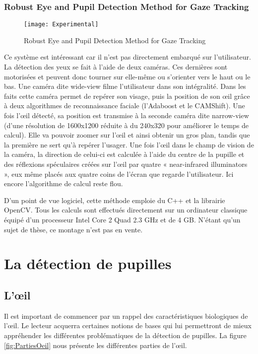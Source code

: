 \subsubsection{Robust Eye and Pupil Detection Method for Gaze Tracking \cite{gwon2013robust}}
\label{SystSC}

\begin{figure}[H]
  \centering
  \texttt{[image: Experimental]}
  \caption{Robust Eye and Pupil Detection Method for Gaze Tracking}
  \label{fig:Experimental}
\end{figure}

Ce système est intéressant car il n’est pas directement embarqué sur l’utilisateur. La détection des yeux se fait à l’aide de deux caméras. Ces dernières sont motorisées et peuvent donc tourner sur elle-même ou s’orienter vers le haut ou le bas. 
Une caméra dite wide-view filme l’utilisateur dans son intégralité. Dans les faits cette caméra permet de repérer son visage, puis la position de son œil grâce à deux algorithmes de reconnaissance faciale (l’Adaboost et le CAMShift). Une fois l’œil détecté, sa position est transmise à la seconde caméra dite narrow-view (d’une résolution de 1600x1200 réduite à du 240x320 pour améliorer le temps de calcul). Elle va pouvoir zoomer sur l’œil et ainsi obtenir un gros plan, tandis que la première ne sert qu’à repérer l’usager. Une fois l’œil dans le champ de vision de la caméra, la direction de celui-ci est calculée à l’aide du centre de la pupille et des réflexions spéculaires créées sur l’œil par quatre « near-infrared illuminators », eux même placés aux quatre coins de l’écran que regarde l’utilisateur. Ici encore l’algorithme de calcul reste flou.

D’un point de vue logiciel, cette méthode emploie du C++ et la librairie OpenCV. Tous les calculs sont effectués directement sur un ordinateur classique équipé d’un processeur Intel Core 2 Quad 2.3 GHz et de 4 GB.
N’étant qu’un sujet de thèse, ce montage n’est pas en vente.

\section{La détection de pupilles}

\subsection{L’œil}

Il est important de commencer par un rappel des caractéristiques biologiques de l’œil. Le lecteur acquerra certaines notions de bases qui lui permettront de mieux appréhender les différentes problématiques de la détection de pupilles.
La figure \ref{fig:PartiesOeil} nous présente les différentes parties de l’œil.

